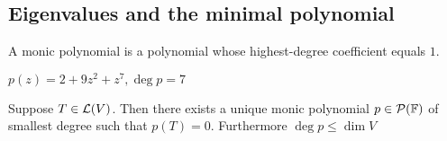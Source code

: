 \subsection{Eigenvalues and the minimal polynomial}
\begin{mydef}
    A monic polynomial is a polynomial whose highest-degree coefficient equals $1$. 
\end{mydef}
\begin{example}
    $p(z)=2+9z^2+z^7, \deg p = 7$
\end{example}

\begin{thm}
    \label{unique-monic-polynomial-of-smallest-degree}
    Suppose $T\in \mathcal{L}(V)$. Then there exists a unique monic polynomial $p\in \mathcal{P}(\mathbb{F})$ of smallest degree such that $p(T)=0$. Furthermore $\deg p \leq \dim V$
\end{thm}
